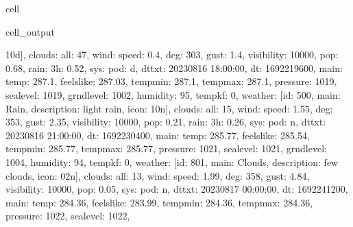 \documentclass[letterpaper,10pt,english]{jupyterBook}
\begin{document}
\begin{sphinxuseclass}{cell}
\begin{sphinxVerbatimOutput}
\begin{sphinxuseclass}{cell_output}
\begin{sphinxVerbatim}[commandchars=\\\{\}]
\PYGZsq{}10d\PYGZsq{}\PYGZcb{}], \PYGZsq{}clouds\PYGZsq{}: \PYGZob{}\PYGZsq{}all\PYGZsq{}: 47\PYGZcb{}, \PYGZsq{}wind\PYGZsq{}: \PYGZob{}\PYGZsq{}speed\PYGZsq{}: 0.4, \PYGZsq{}deg\PYGZsq{}: 303, \PYGZsq{}gust\PYGZsq{}: 1.4\PYGZcb{}, \PYGZsq{}visibility\PYGZsq{}: 10000, \PYGZsq{}pop\PYGZsq{}: 0.68, \PYGZsq{}rain\PYGZsq{}: \PYGZob{}\PYGZsq{}3h\PYGZsq{}: 0.52\PYGZcb{}, \PYGZsq{}sys\PYGZsq{}: \PYGZob{}\PYGZsq{}pod\PYGZsq{}: \PYGZsq{}d\PYGZsq{}\PYGZcb{}, \PYGZsq{}dt\PYGZus{}txt\PYGZsq{}: \PYGZsq{}2023\PYGZhy{}08\PYGZhy{}16 18:00:00\PYGZsq{}\PYGZcb{}, \PYGZob{}\PYGZsq{}dt\PYGZsq{}: 1692219600, \PYGZsq{}main\PYGZsq{}: \PYGZob{}\PYGZsq{}temp\PYGZsq{}: 287.1, \PYGZsq{}feels\PYGZus{}like\PYGZsq{}: 287.03, \PYGZsq{}temp\PYGZus{}min\PYGZsq{}: 287.1, \PYGZsq{}temp\PYGZus{}max\PYGZsq{}: 287.1, \PYGZsq{}pressure\PYGZsq{}: 1019, \PYGZsq{}sea\PYGZus{}level\PYGZsq{}: 1019, \PYGZsq{}grnd\PYGZus{}level\PYGZsq{}: 1002, \PYGZsq{}humidity\PYGZsq{}: 95, \PYGZsq{}temp\PYGZus{}kf\PYGZsq{}: 0\PYGZcb{}, \PYGZsq{}weather\PYGZsq{}: [\PYGZob{}\PYGZsq{}id\PYGZsq{}: 500, \PYGZsq{}main\PYGZsq{}: \PYGZsq{}Rain\PYGZsq{}, \PYGZsq{}description\PYGZsq{}: \PYGZsq{}light rain\PYGZsq{}, \PYGZsq{}icon\PYGZsq{}: \PYGZsq{}10n\PYGZsq{}\PYGZcb{}], \PYGZsq{}clouds\PYGZsq{}: \PYGZob{}\PYGZsq{}all\PYGZsq{}: 15\PYGZcb{}, \PYGZsq{}wind\PYGZsq{}: \PYGZob{}\PYGZsq{}speed\PYGZsq{}: 1.55, \PYGZsq{}deg\PYGZsq{}: 353, \PYGZsq{}gust\PYGZsq{}: 2.35\PYGZcb{}, \PYGZsq{}visibility\PYGZsq{}: 10000, \PYGZsq{}pop\PYGZsq{}: 0.21, \PYGZsq{}rain\PYGZsq{}: \PYGZob{}\PYGZsq{}3h\PYGZsq{}: 0.26\PYGZcb{}, \PYGZsq{}sys\PYGZsq{}: \PYGZob{}\PYGZsq{}pod\PYGZsq{}: \PYGZsq{}n\PYGZsq{}\PYGZcb{}, \PYGZsq{}dt\PYGZus{}txt\PYGZsq{}: \PYGZsq{}2023\PYGZhy{}08\PYGZhy{}16 21:00:00\PYGZsq{}\PYGZcb{}, \PYGZob{}\PYGZsq{}dt\PYGZsq{}: 1692230400, \PYGZsq{}main\PYGZsq{}: \PYGZob{}\PYGZsq{}temp\PYGZsq{}: 285.77, \PYGZsq{}feels\PYGZus{}like\PYGZsq{}: 285.54, \PYGZsq{}temp\PYGZus{}min\PYGZsq{}: 285.77, \PYGZsq{}temp\PYGZus{}max\PYGZsq{}: 285.77, \PYGZsq{}pressure\PYGZsq{}: 1021, \PYGZsq{}sea\PYGZus{}level\PYGZsq{}: 1021, \PYGZsq{}grnd\PYGZus{}level\PYGZsq{}: 1004, \PYGZsq{}humidity\PYGZsq{}: 94, \PYGZsq{}temp\PYGZus{}kf\PYGZsq{}: 0\PYGZcb{}, \PYGZsq{}weather\PYGZsq{}: [\PYGZob{}\PYGZsq{}id\PYGZsq{}: 801, \PYGZsq{}main\PYGZsq{}: \PYGZsq{}Clouds\PYGZsq{}, \PYGZsq{}description\PYGZsq{}: \PYGZsq{}few clouds\PYGZsq{}, \PYGZsq{}icon\PYGZsq{}: \PYGZsq{}02n\PYGZsq{}\PYGZcb{}], \PYGZsq{}clouds\PYGZsq{}: \PYGZob{}\PYGZsq{}all\PYGZsq{}: 13\PYGZcb{}, \PYGZsq{}wind\PYGZsq{}: \PYGZob{}\PYGZsq{}speed\PYGZsq{}: 1.99, \PYGZsq{}deg\PYGZsq{}: 358, \PYGZsq{}gust\PYGZsq{}: 4.84\PYGZcb{}, \PYGZsq{}visibility\PYGZsq{}: 10000, \PYGZsq{}pop\PYGZsq{}: 0.05, \PYGZsq{}sys\PYGZsq{}: \PYGZob{}\PYGZsq{}pod\PYGZsq{}: \PYGZsq{}n\PYGZsq{}\PYGZcb{}, \PYGZsq{}dt\PYGZus{}txt\PYGZsq{}: \PYGZsq{}2023\PYGZhy{}08\PYGZhy{}17 00:00:00\PYGZsq{}\PYGZcb{}, \PYGZob{}\PYGZsq{}dt\PYGZsq{}: 1692241200, \PYGZsq{}main\PYGZsq{}: \PYGZob{}\PYGZsq{}temp\PYGZsq{}: 284.36, \PYGZsq{}feels\PYGZus{}like\PYGZsq{}: 283.99, \PYGZsq{}temp\PYGZus{}min\PYGZsq{}: 284.36, \PYGZsq{}temp\PYGZus{}max\PYGZsq{}: 284.36, \PYGZsq{}pressure\PYGZsq{}: 1022, \PYGZsq{}sea\PYGZus{}level\PYGZsq{}: 1022, 
\end{sphinxVerbatim}
\end{sphinxuseclass}
\end{sphinxVerbatimOutput}
\end{sphinxuseclass}
\end{document}
